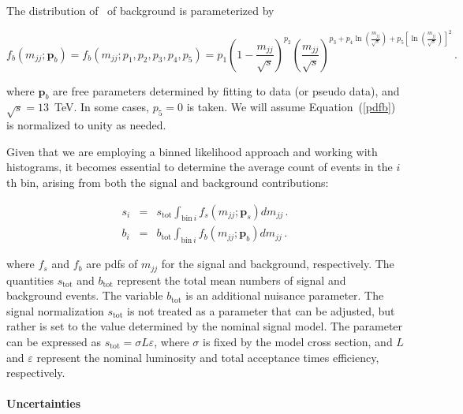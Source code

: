 
The distribution of \mjj~of background is parameterized by

\begin{equation}\label{pdfb}
f_b(m_{jj};\bm{p}_b) = f_b(m_{jj};p_1,p_2,p_3,p_4,p_5) = p_1 \left( 1
- \frac{m_{jj}}{\sqrt{s}} \right)^{p_2} \left( \frac{m_{jj}}{\sqrt{s}}
\right)^{p_3 + p_4\ln\left( \frac{m_{jj}}{\sqrt{s}} \right) +  p_5
  \left[ \ln \left( \frac{m_{jj}}{\sqrt{s}} \right) \right]^2}\, .  
\end{equation}

\noindent
where $\bm{p}_b$ are free parameters determined by fitting to data (or 
pseudo data), and $\sqrt{s} = 13$~TeV.
In some cases, $p_5 = 0$ is taken. 
We will assume Equation~(\ref{pdfb}) is normalized to unity as needed.

Given that we are employing a binned likelihood approach and working with histograms, it becomes essential to determine the average count of events in the $i$th bin, arising from both the signal and background contributions:

\begin{eqnarray}
s_i & = & s_\mathrm{tot} \int_{\mathrm{bin}\ i} f_s(m_{jj};\bm{p}_s)
dm_{jj}\, .\\
b_i & = & b_\mathrm{tot} \int_{\mathrm{bin}\ i} f_b(m_{jj};\bm{p}_b) dm_{jj}\, .
\end{eqnarray}

\noindent
where $f_s$ and $f_b$ are pdfs of $m_{jj}$ for the signal and
background, respectively. 
The quantities $s_\mathrm{tot}$ and $b_\mathrm{tot}$ represent the total mean
numbers of signal and background events.
The variable $b_\mathrm{tot}$ is an additional nuisance parameter.
The signal normalization $s_\mathrm{tot}$ is  not treated as a parameter that can be adjusted, but rather is set to the value determined by the nominal signal model. 
The parameter can be expressed as $s_\mathrm{tot} = \sigma L \varepsilon$,
where $\sigma$ is fixed by the model cross section, and $L$ and
$\varepsilon$ represent the nominal luminosity and total acceptance times
efficiency, respectively.


\paragraph{Uncertainties}\mbox{}\par
\label{sec:unc}

